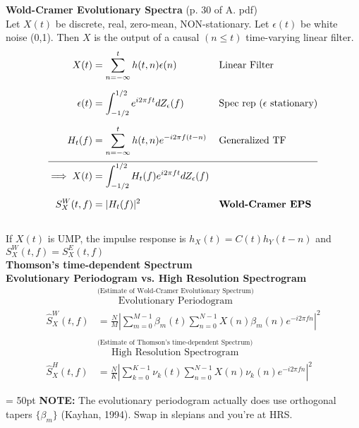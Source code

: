 \colorbox{bzadeh}{\color{black}\textbf{Wold-Cramer Evolutionary Spectra}}  (p. 30 of A. pdf)\\ 
Let $X(t)$ be discrete, real, zero-mean, NON-stationary. Let $\epsilon(t)$ be white noise (0,1). Then $X$ is the output of a causal $(n\leq t)$ time-varying linear filter.
\[
\begin{aligned}
    X(t) &= \sum_{n=-\infty}^t h(t,n)\epsilon(n)                &&\text{Linear Filter}
    \\[5pt]
    \epsilon(t) &= \int_{-1/2}^{1/2}e^{i2\pi ft}dZ_\epsilon (f) &&\text{Spec rep }(\epsilon \text{ stationary})
    \\[5pt]
    H_t(f) &= \sum_{n=-\infty}^t h(t,n) e^{-i2\pi f(t-n)}       &&\text{Generalized TF}
    \\[5pt]\hline\\[-15pt]
    \implies X(t) &= \int_{-1/2}^{1/2} H_t(f) e^{i2\pi ft}dZ_\epsilon (f)
    \\[5pt]
    S^W_X(t,f) &= |H_t(f)|^2
    &&\textbf{Wold-Cramer EPS} 
\end{aligned}
\]\\
If $X(t)$ is UMP, the impulse response is  $h_X(t) = C(t)h_Y(t-n)$ and $S^W_X(t,f) = S^E_X(t,f)$ \\

\colorbox{bzadeh}{\color{black}\textbf{Thomson's time-dependent Spectrum}} \\

\colorbox{bzadeh}{\color{black}\textbf{Evolutionary Periodogram vs. High Resolution Spectrogram}}
\\
\[
\begin{aligned}
    &  \stackrel{\text{(Estimate of Wold-Cramer Evolutionary Spectrum)}}{\text{Evolutionary Periodogram}} 
    \\
       \hat S^W_X(t,f) 
    &= \frac{N}{M}\left| \sum_{m=0}^{M-1}\beta_m(t)\sum_{n=0}^{N-1} X(n)\beta_m(n)e^{-i2\pi fn} \right|^2
    \\&\\
    &  \stackrel{\text{(Estimate of Thomson's time-dependent Spectrum)}}{\text{High Resolution Spectrogram}} 
    \\
       \hat S^H_X(t,f) 
    &= \frac{N}{K}\left| \sum_{k=0}^{K-1}\nu_k(t)\sum_{n=0}^{N-1} X(n)\nu_k(n)e^{-i2\pi fn} \right|^2 
\end{aligned}
\]

\hangindent = 50pt
\textbf{NOTE:} The evolutionary periodogram actually does use orthogonal tapers $\{\beta_m\}$ (Kayhan, 1994). Swap in slepians and you're at HRS.

